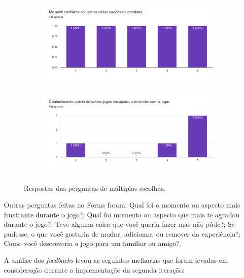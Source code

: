 \documentclass[
	12pt,				%
	openright,			%
	twoside,			%
	a4paper,			%
	english,			%
	french,				%
	spanish,			%
	brazil				%
	]{abntex2}
\begin{document}
\begin{figure}[h!]
\begin{subfigure}[b]{0.49\linewidth}
  \end{subfigure}
  \begin{subfigure}[b]{0.49\linewidth}
    \includegraphics[width=\linewidth]{forms9.png}
  \end{subfigure}
  \begin{subfigure}[b]{0.49\linewidth}
    \includegraphics[width=\linewidth]{forms10.png}
  \end{subfigure}
  \caption{Respostas das perguntas de múltiplas escolhas.}
  \label{fig:feedback}
\end{figure}

	Outras perguntas feitas no Forms foram: Qual foi o momento ou aspecto mais frustrante durante o jogo?; Qual foi momento ou aspecto que mais te agradou durante o jogo?; Teve alguma coisa que você queria fazer mas não pôde?; Se pudesse, o que você gostaria de mudar, adicionar, ou remover da experiência?; Como você descreveria o jogo para um familiar ou amigo?.
	
	A análise dos \emph{feedbacks} levou as seguintes melhorias que foram levadas em consideração durante a implementação da segunda iteração:
\end{document}
